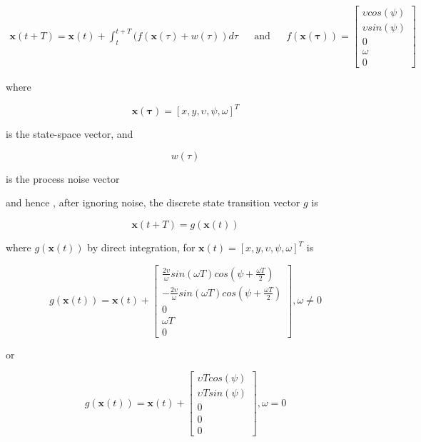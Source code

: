 \begin{equation}
\begin{aligned}
\mathbf{x}(t+T) = \mathbf{x}(t) + \int_{t}^{t+T}(f(\mathbf{x}(\tau)+w(\tau) )d\tau &&\text{and}&& f(\mathbf{x(\tau)})=  \begin{bmatrix}\upsilon cos(\psi) \\ \upsilon sin(\psi) \\ 0 \\ \omega \\ 0  \end{bmatrix}
\end{aligned}
\end{equation}

where 

\begin{equation}
\mathbf{x(\tau)} = \left[x,y,\upsilon, \psi,\omega\right]^{T}
\end{equation}

is the state-space vector, and

\begin{equation}
w(\tau ) 
\end{equation}

is the process noise vector

and hence , after ignoring noise,  the discrete state transition vector $g$ is


\begin{equation}
\mathbf{x}(t+T) = g\left(\mathbf{x}(t)\right)
\end{equation}

where $g(\mathbf{x}(t))$ by direct integration, for $\mathbf{x}(t) =\left[x,y,\upsilon, \psi,\omega\right]^{T} $ is



\begin{equation}
g(\mathbf{x}(t)) = \mathbf{x}(t) +  \begin{bmatrix}
\frac{2\upsilon}{\omega}sin(\omega T)cos(\psi + \frac{\omega T}{2})\\
-\frac{2\upsilon}{\omega}sin(\omega T)cos(\psi + \frac{\omega T}{2})\\
0 \\
\omega T \\
0
\end{bmatrix} , \omega \neq 0
\end{equation}

or


\begin{equation}
g(\mathbf{x}(t)) = \mathbf{x}(t) +  \begin{bmatrix}
\upsilon T cos(\psi)\\
\upsilon T sin(\psi)\\
0 \\
0 \\
0
\end{bmatrix} ,  \omega = 0
\end{equation}

